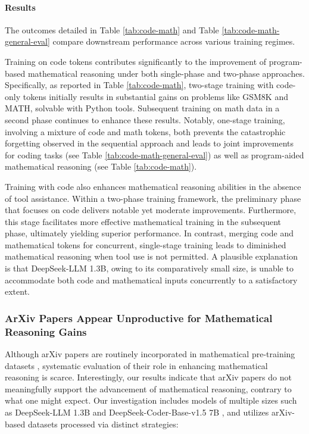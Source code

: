 \begin{itemize}[topsep=0pt]
\begin{itemize}[topsep=0pt]
\paragraph{Results}
The outcomes detailed in Table \ref{tab:code-math} and Table \ref{tab:code-math-general-eval} compare downstream performance across various training regimes.

Training on code tokens contributes significantly to the improvement of program-based mathematical reasoning under both single-phase and two-phase approaches. Specifically, as reported in Table \ref{tab:code-math}, two-stage training with code-only tokens initially results in substantial gains on problems like GSM8K and MATH, solvable with Python tools. Subsequent training on math data in a second phase continues to enhance these results. Notably, one-stage training, involving a mixture of code and math tokens, both prevents the catastrophic forgetting observed in the sequential approach and leads to joint improvements for coding tasks (see Table \ref{tab:code-math-general-eval}) as well as program-aided mathematical reasoning (see Table \ref{tab:code-math}).

Training with code also enhances mathematical reasoning abilities in the absence of tool assistance. Within a two-phase training framework, the preliminary phase that focuses on code delivers notable yet moderate improvements. Furthermore, this stage facilitates more effective mathematical training in the subsequent phase, ultimately yielding superior performance. In contrast, merging code and mathematical tokens for concurrent, single-stage training leads to diminished mathematical reasoning when tool use is not permitted. A plausible explanation is that DeepSeek-LLM 1.3B, owing to its comparatively small size, is unable to accommodate both code and mathematical inputs concurrently to a satisfactory extent.

\subsubsection{ArXiv Papers Appear Unproductive for Mathematical Reasoning Gains}

Although arXiv papers are routinely incorporated in mathematical pre-training datasets \citep{minerva,gpt-f,llemma,mathpile}, systematic evaluation of their role in enhancing mathematical reasoning is scarce. Interestingly, our results indicate that arXiv papers do not meaningfully support the advancement of mathematical reasoning, contrary to what one might expect. Our investigation includes models of multiple sizes such as DeepSeek-LLM 1.3B and DeepSeek-Coder-Base-v1.5 7B \citep{deepseek-coder}, and utilizes arXiv-based datasets processed via distinct strategies:


\end{itemize}
\end{itemize}
